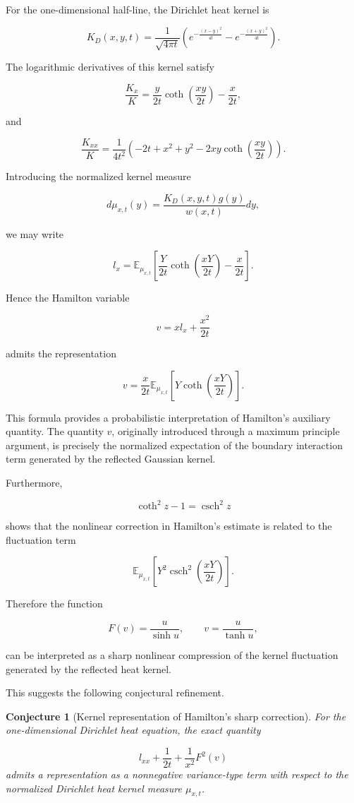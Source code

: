 \documentclass[11pt]{amsart}
\DeclareMathOperator{\csch}{csch}
\newtheorem{conjecture}[theorem]{Conjecture}
\theoremstyle{definition}
\theoremstyle{remark}
\begin{document}
For the one-dimensional half-line, the Dirichlet heat kernel is

\[
K_D(x,y,t)
=
\frac1{\sqrt{4\pi t}}
\left(
e^{-\frac{(x-y)^2}{4t}}
-
e^{-\frac{(x+y)^2}{4t}}
\right).
\]


The logarithmic derivatives of this kernel satisfy

\[
\frac{K_x}{K}
=
\frac{y}{2t}
\coth
\left(
\frac{xy}{2t}
\right)
-\frac{x}{2t},
\]

and

\[
\frac{K_{xx}}{K}
=
\frac1{4t^2}
\left(
-2t+x^2+y^2
-2xy\coth
\left(
\frac{xy}{2t}
\right)
\right).
\]


Introducing the normalized kernel measure

\[
d\mu_{x,t}(y)
=
\frac{
K_D(x,y,t)g(y)
}{
w(x,t)
}dy ,
\]

we may write

\[
l_x
=
\mathbb E_{\mu_{x,t}}
\left[
\frac{Y}{2t}
\coth
\left(
\frac{xY}{2t}
\right)
-\frac{x}{2t}
\right].
\]


Hence the Hamilton variable

\[
v
=
xl_x+\frac{x^2}{2t}
\]

admits the representation

\[
\boxed{
v
=
\frac{x}{2t}
\mathbb E_{\mu_{x,t}}
\left[
Y
\coth
\left(
\frac{xY}{2t}
\right)
\right].
}
\]


This formula provides a probabilistic interpretation of Hamilton's
auxiliary quantity. The quantity \(v\), originally introduced
through a maximum principle argument, is precisely the normalized
expectation of the boundary interaction term generated by the
reflected Gaussian kernel.


Furthermore,

\[
\coth^2 z-1=\csch^2 z
\]

shows that the nonlinear correction in Hamilton's estimate is
related to the fluctuation term

\[
\mathbb E_{\mu_{x,t}}
\left[
Y^2\csch^2
\left(
\frac{xY}{2t}
\right)
\right].
\]


Therefore the function

\[
F(v)=\frac{u}{\sinh u},
\qquad
v=\frac{u}{\tanh u},
\]

can be interpreted as a sharp nonlinear compression of the kernel
fluctuation generated by the reflected heat kernel.


This suggests the following conjectural refinement.

\begin{conjecture}[Kernel representation of Hamilton's sharp correction]

For the one-dimensional Dirichlet heat equation, the exact quantity

\[
l_{xx}
+\frac1{2t}
+\frac1{x^2}F^2(v)
\]
admits a representation as a nonnegative variance-type term with
respect to the normalized Dirichlet heat kernel measure
\(\mu_{x,t}\).

\end{conjecture}
\end{document}
